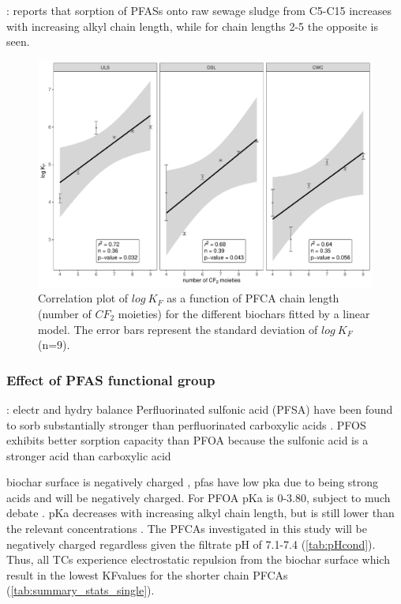 \citep{zhang2013sorption}: reports that sorption of PFASs onto raw sewage sludge from C5-C15 increases with increasing alkyl chain length, while for chain lengths 2-5 the opposite is seen. 

\begin{figure}
    \centering
    \includegraphics[width=\textwidth]{R/figs/chainlength_KF.pdf}
    \caption{Correlation plot of $log~K_F$ as a function of PFCA chain length (number of $CF_2$ moieties) for the different biochars fitted by a linear model. The error bars represent the standard deviation of $log~ K_F$ (n=9).}
    \label{fig:chainlength}
\end{figure}

\subsubsection{Effect of PFAS functional group}
\cite{du2014adsorption}: electr and hydry balance 
Perfluorinated sulfonic acid (PFSA) have been found to sorb substantially stronger than perfluorinated carboxylic acids \citep{zhang2013sorption,zhang2021sorption}. PFOS exhibits better sorption capacity than PFOA because the sulfonic acid is a stronger acid than carboxylic acid \citep{arvaniti2015review}

biochar surface is negatively charged \citep{Ahmad2014}, pfas have low pka due to being strong acids and will be negatively charged. For PFOA pKa is 0-3.80, subject to much debate \citep{Goss2009comment,ding2013physicochemical}. pKa decreases with increasing alkyl chain length, but is still lower than the relevant concentrations \citep{ding2013physicochemical}. The PFCAs investigated in this study will be negatively charged regardless given the filtrate pH of 7.1-7.4 (\cref{tab:pHcond}). Thus, all TCs experience electrostatic repulsion from the biochar surface which result in the lowest KFvalues for the shorter chain PFCAs (\cref{tab:summary_stats_single}). 

